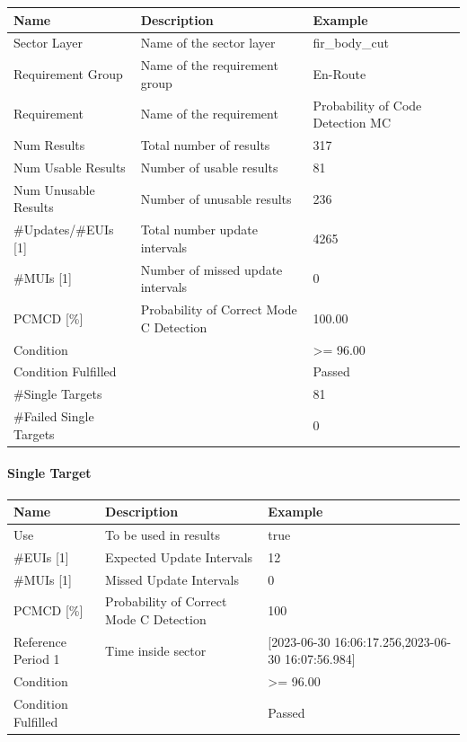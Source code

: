 \begin{center}
 \begin{table}[H]
  \begin{tabularx}{\textwidth}{ | l | X |  l | }
    \hline
    \textbf{Name} & \textbf{Description} & \textbf{Example} \\ \hline
    Sector Layer & Name of the sector layer & fir\_body\_cut \\ \hline
    Requirement Group & Name of the requirement group & En-Route \\ \hline
    Requirement & Name of the requirement & Probability of Code Detection MC \\ \hline
    Num Results & Total number of results & 317 \\ \hline
    Num Usable Results & Number of usable results & 81 \\ \hline
    Num Unusable Results & Number of unusable results & 236 \\ \hline
    \#Updates/\#EUIs [1] & Total number update intervals & 4265 \\ \hline
    \#MUIs [1] & Number of missed update intervals & 0 \\ \hline
    PCMCD [\%] & Probability of Correct Mode C Detection & 100.00 \\ \hline
    Condition &  & >= 96.00 \\ \hline
    Condition Fulfilled &  & Passed \\ \hline
    \#Single Targets &  & 81 \\ \hline
    \#Failed Single Targets &  & 0 \\ \hline
\end{tabularx}
\end{table}
\end{center}

\paragraph{Single Target}

\begin{center}
 \begin{table}[H]
  \begin{tabularx}{\textwidth}{ | l | X |  l | }
    \hline
    \textbf{Name} & \textbf{Description} & \textbf{Example} \\ \hline
    Use & To be used in results & true \\ \hline
    \#EUIs [1] & Expected Update Intervals & 12 \\ \hline
    \#MUIs [1] & Missed Update Intervals & 0 \\ \hline
    PCMCD [\%] & Probability of Correct Mode C Detection & 100 \\ \hline
    Reference Period 1 & Time inside sector & [2023-06-30 16:06:17.256,2023-06-30 16:07:56.984] \\ \hline
    Condition &  & >= 96.00 \\ \hline
    Condition Fulfilled &  & Passed \\ \hline
\end{tabularx}
\end{table}
\end{center}

